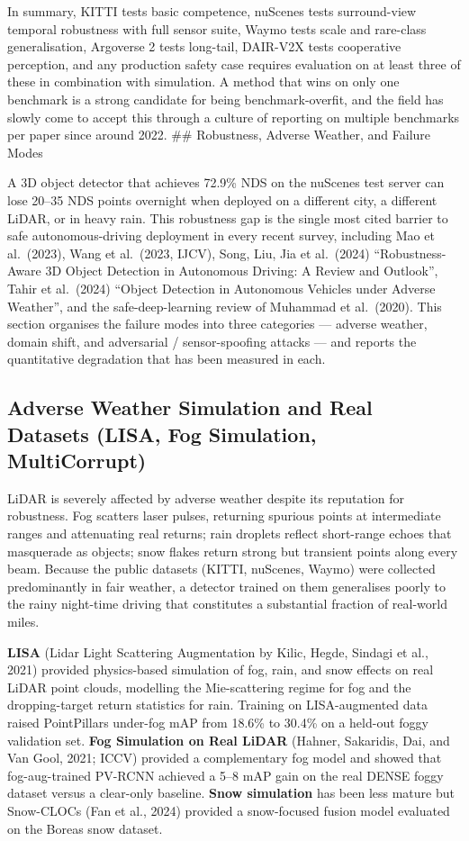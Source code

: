 In summary, KITTI tests basic competence, nuScenes tests surround-view temporal robustness with full sensor suite, Waymo tests scale and rare-class generalisation, Argoverse 2 tests long-tail, DAIR-V2X tests cooperative perception, and any production safety case requires evaluation on at least three of these in combination with simulation. A method that wins on only one benchmark is a strong candidate for being benchmark-overfit, and the field has slowly come to accept this through a culture of reporting on multiple benchmarks per paper since around 2022.
\#\# Robustness, Adverse Weather, and Failure Modes

A 3D object detector that achieves 72.9\% NDS on the nuScenes test server can lose 20--35 NDS points overnight when deployed on a different city, a different LiDAR, or in heavy rain. This robustness gap is the single most cited barrier to safe autonomous-driving deployment in every recent survey, including Mao et al.~(2023), Wang et al.~(2023, IJCV), Song, Liu, Jia et al.~(2024) ``Robustness-Aware 3D Object Detection in Autonomous Driving: A Review and Outlook'', Tahir et al.~(2024) ``Object Detection in Autonomous Vehicles under Adverse Weather'', and the safe-deep-learning review of Muhammad et al.~(2020). This section organises the failure modes into three categories --- adverse weather, domain shift, and adversarial / sensor-spoofing attacks --- and reports the quantitative degradation that has been measured in each.

\subsection{Adverse Weather Simulation and Real Datasets (LISA, Fog Simulation, MultiCorrupt)}\label{adverse-weather-simulation-and-real-datasets-lisa-fog-simulation-multicorrupt}

LiDAR is severely affected by adverse weather despite its reputation for robustness. Fog scatters laser pulses, returning spurious points at intermediate ranges and attenuating real returns; rain droplets reflect short-range echoes that masquerade as objects; snow flakes return strong but transient points along every beam. Because the public datasets (KITTI, nuScenes, Waymo) were collected predominantly in fair weather, a detector trained on them generalises poorly to the rainy night-time driving that constitutes a substantial fraction of real-world miles.

\textbf{LISA} (Lidar Light Scattering Augmentation by Kilic, Hegde, Sindagi et al., 2021) provided physics-based simulation of fog, rain, and snow effects on real LiDAR point clouds, modelling the Mie-scattering regime for fog and the dropping-target return statistics for rain. Training on LISA-augmented data raised PointPillars under-fog mAP from 18.6\% to 30.4\% on a held-out foggy validation set. \textbf{Fog Simulation on Real LiDAR} (Hahner, Sakaridis, Dai, and Van Gool, 2021; ICCV) provided a complementary fog model and showed that fog-aug-trained PV-RCNN achieved a 5--8 mAP gain on the real DENSE foggy dataset versus a clear-only baseline. \textbf{Snow simulation} has been less mature but Snow-CLOCs (Fan et al., 2024) provided a snow-focused fusion model evaluated on the Boreas snow dataset.

